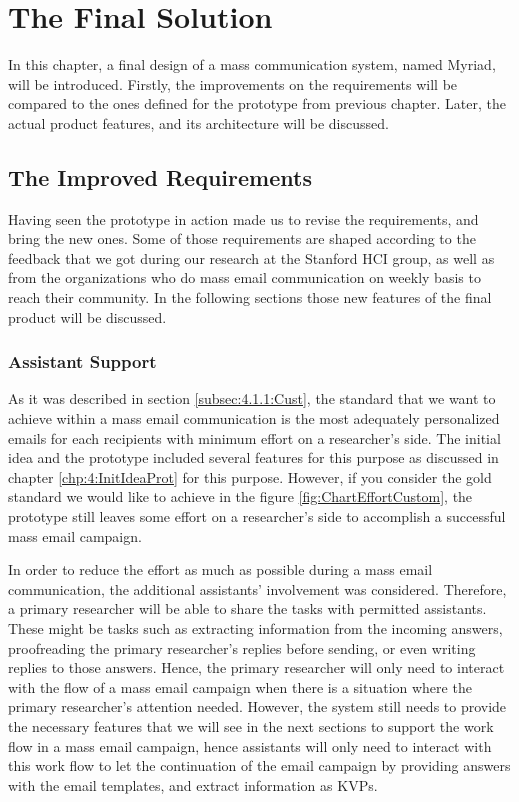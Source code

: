 \chapter{The Final Solution}
\label{chp:5:FinaSolu}
In this chapter, a final design of a mass communication system, named Myriad, will be introduced. Firstly, the improvements on the requirements will be compared to the ones defined for the prototype from previous chapter. Later, the actual product features, and its architecture will be discussed.

\section{The Improved Requirements}
\label{sec:5.1:ImprRequ}

Having seen the prototype in action made us to revise the requirements, and bring the new ones. Some of those requirements are shaped according to the feedback that we got during our research at the Stanford \ac{HCI} group, as well as from the organizations who do mass email communication on weekly basis to reach their community. In the following sections those new features of the final product will be discussed.

\subsection{Assistant Support}
\label{subsec:5.1.1:AssiSupp}
As it was described in section \ref{subsec:4.1.1:Cust}, the standard that we want to achieve within a mass email communication is the most adequately personalized emails for each recipients with minimum effort on a researcher's side. The initial idea and the prototype included several features for this purpose as discussed in chapter \ref{chp:4:InitIdeaProt} for this purpose. However, if you consider the gold standard we would like to achieve in the figure \ref{fig:ChartEffortCustom}, the prototype still leaves some effort on a researcher's side to accomplish a successful mass email campaign.
\vspace{1cm}

In order to reduce the effort as much as possible during a mass email communication, the additional assistants' involvement was considered. Therefore, a primary researcher will be able to share the tasks with permitted assistants. These might be tasks such as extracting information from the incoming answers, proofreading the primary researcher's replies before sending, or even writing replies to those answers. Hence, the primary researcher will only need to interact with the flow of a mass email campaign when there is a situation where the primary researcher's attention needed. However, the system still needs to provide the necessary features that we will see in the next sections to support the work flow in a mass email campaign, hence assistants will only need to interact with this work flow to let the continuation of the email campaign by providing answers with the email templates, and extract information as \ac{KVP}s.

